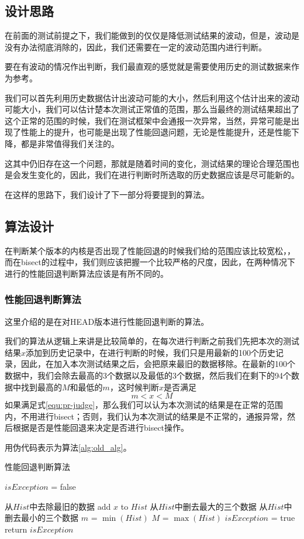 \subsection{设计思路}
在前面的测试前提之下，我们能做到的仅仅是降低测试结果的波动，但是，波动是没有办法彻底消除的，因此，我们还需要在一定的波动范围内进行判断。

要在有波动的情况作出判断，我们最直观的感觉就是需要使用历史的测试数据来作为参考。

我们可以首先利用历史数据估计出波动可能的大小，然后利用这个估计出来的波动可能大小，我们可以估计楚本次测试正常值的范围，那么当最终的测试结果超出了这个正常的范围的时候，我们在测试框架中会通报一次异常，当然，异常可能是出现了性能上的提升，也可能是出现了性能回退问题，无论是性能提升，还是性能下降，都是非常值得我们关注的。

这其中仍旧存在这一个问题，那就是随着时间的变化，测试结果的理论合理范围也是会发生变化的，因此，我们在进行判断时所选取的历史数据应该是尽可能新的。

在这样的思路下，我们设计了下一部分将要提到的算法。

\subsection{算法设计}
在判断某个版本的内核是否出现了性能回退的时候我们给的范围应该比较宽松，，而在bisect的过程中，我们则应该把握一个比较严格的尺度，因此，在两种情况下进行的性能回退判断算法应该是有所不同的。

\subsubsection{性能回退判断算法}
这里介绍的是在对HEAD版本进行性能回退判断的算法。

我们的算法从逻辑上来讲是比较简单的，在每次进行判断之前我们先把本次的测试结果$x$添加到历史记录中，在进行判断的时候，我们只是用最新的100个历史记录，因此，在加入本次测试结果之后，会把原来最旧的数据移除。在最新的100个数据中，我们会除去最高的3个数据以及最低的3个数据，然后我们在剩下的94个数据中找到最高的$M$和最低的$m$，这时候判断$x$是否满足
\begin{equation}
\label{equ:pr-judge}
m<x<M
\end{equation}
如果满足式\ref{equ:pr-judge}，那么我们可以认为本次测试的结果是在正常的范围内，不用进行bisect；否则，我们认为本次测试的结果是不正常的，通报异常，然后根据是否是性能回退来决定是否进行bisect操作。

用伪代码表示为算法\ref{alg:old_alg}。

\begin{algorithm}
\caption{性能回退判断算法}
\label{alg:old_alg}
$isException$ = false\;

从$Hist$中去除最旧的数据\;
add $x$ to $Hist$\;
从$Hist$中删去最大的三个数据\;
从$Hist$中删去最小的三个数据\;
$m$ = $\min(Hist)$\;
$M$ = $\max(Hist)$\;
{
	$isException$ = true\;
}
return $isException$\;
\end{algorithm}



